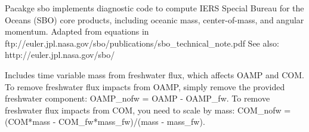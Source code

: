 
Pacakge sbo implements diagnostic code to compute IERS Special
Bureau for the Oceans (SBO) core products, including oceanic mass,
center-of-mass, and angular momentum.
Adapted from equations in
ftp://euler.jpl.nasa.gov/sbo/publications/sbo_technical_note.pdf
See also: http://euler.jpl.nasa.gov/sbo/

Includes time variable mass from freshwater flux, which affects OAMP
and COM.  To remove freshwater flux impacts from OAMP, simply remove
the provided freshwater component: OAMP_nofw = OAMP - OAMP_fw.  To
remove freshwater flux impacts from COM, you need to scale by mass:
COM_nofw = (COM*mass - COM_fw*mass_fw)/(mass - mass_fw).
